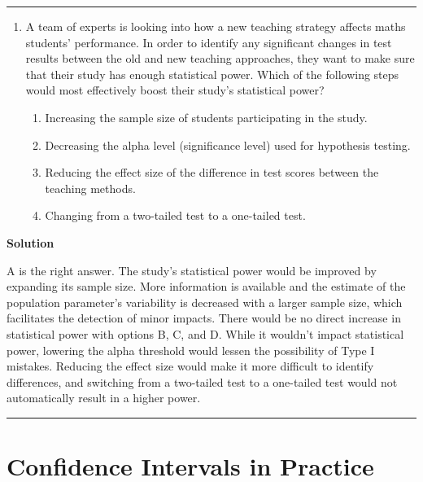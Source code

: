 \documentclass[
  letterpaper,
  DIV=11,
  numbers=noendperiod,
  oneside]{scrreprt}
\providecommand{\tightlist}{%
  \setlength{\itemsep}{0pt}\setlength{\parskip}{0pt}}\usepackage{longtable,booktabs,array}
\begin{document}
\begin{center}\rule{0.5\linewidth}{0.5pt}\end{center}

\begin{enumerate}
\def\labelenumi{\arabic{enumi}.}
\setcounter{enumi}{5}
\tightlist
\item
  A team of experts is looking into how a new teaching strategy affects
  maths students' performance. In order to identify any significant
  changes in test results between the old and new teaching approaches,
  they want to make sure that their study has enough statistical power.
  Which of the following steps would most effectively boost their
  study's statistical power?

  \begin{enumerate}
  \def\labelenumii{\alph{enumii}.}
  \tightlist
  \item
    Increasing the sample size of students participating in the study.
  \item
    Decreasing the alpha level (significance level) used for hypothesis
    testing.
  \item
    Reducing the effect size of the difference in test scores between
    the teaching methods.
  \item
    Changing from a two-tailed test to a one-tailed test.
  \end{enumerate}
\end{enumerate}

\textbf{Solution}

A is the right answer. The study's statistical power would be improved
by expanding its sample size. More information is available and the
estimate of the population parameter's variability is decreased with a
larger sample size, which facilitates the detection of minor impacts.
There would be no direct increase in statistical power with options B,
C, and D. While it wouldn't impact statistical power, lowering the alpha
threshold would lessen the possibility of Type I mistakes. Reducing the
effect size would make it more difficult to identify differences, and
switching from a two-tailed test to a one-tailed test would not
automatically result in a higher power.

\begin{center}\rule{0.5\linewidth}{0.5pt}\end{center}

\hypertarget{confidence-intervals-in-practice}{%
\chapter{Confidence Intervals in
Practice}\label{confidence-intervals-in-practice}}
\end{document}

